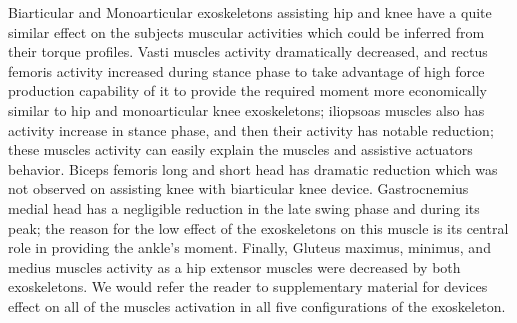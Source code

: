 \documentclass[10pt,letterpaper]{article}
\begin{document}
Biarticular and Monoarticular exoskeletons assisting hip and knee have a quite similar effect on the subjects muscular activities which could be inferred from their torque profiles. Vasti muscles activity dramatically decreased, and rectus femoris activity increased during stance phase to take advantage of high force production capability of it to provide the required moment more economically similar to hip and monoarticular knee exoskeletons; iliopsoas muscles also has activity increase in stance phase, and then their activity has notable reduction; these muscles activity can easily explain the muscles and assistive actuators behavior. Biceps femoris long and short head has dramatic reduction which was not observed on assisting knee with biarticular knee device. Gastrocnemius medial head has a negligible reduction in the late swing phase and during its peak; the reason for the low effect of the exoskeletons on this muscle is its central role in providing the ankle's moment. Finally, Gluteus maximus, minimus, and medius muscles activity as a hip extensor muscles were decreased by both exoskeletons.
We would refer the reader to supplementary material for devices effect on all of the muscles activation in all five configurations of the exoskeleton.
\end{document}
